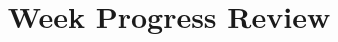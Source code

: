 \documentclass{beamer}
\title{Week  Progress Review}
\author{}
\date{}
\begin{document}
\begin{frame}
\titlepage
\end{frame}
\end{document}
